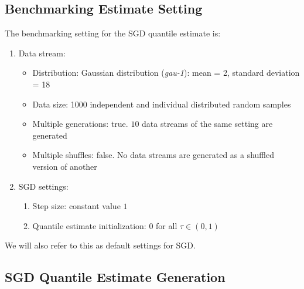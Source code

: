 \subsection{Benchmarking Estimate Setting}
The benchmarking setting for the SGD quantile estimate is:
    \begin{enumerate}
        \item Data stream:
            \begin{itemize}
                \item Distribution: Gaussian distribution (\textit{gau-1}): mean = 2, standard deviation = 18
                \item Data size: 1000 independent and individual distributed random samples
                \item Multiple generations: true. $10$ data streams of the same setting are generated
                \item Multiple shuffles: false. No data streams are generated as a shuffled version of another
            \end{itemize}
        \item SGD settings:
        \begin{enumerate}
            \item Step size: constant value $1$
            \item Quantile estimate initialization: $0$ for all $\tau \in (0,1)$
        \end{enumerate}
            
    \end{enumerate}
We will also refer to this as default settings for SGD.

\subsection{SGD Quantile Estimate Generation}
\label{subsec: exp_generation}

